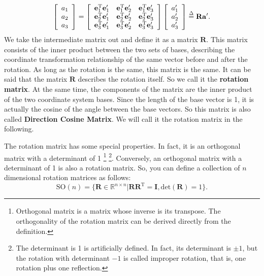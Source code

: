 \begin{equation}
\left[ \begin{array}{l}
{a_1}\\
{a_2}\\
{a_3}
\end{array}\right]=\left[{\begin{array}{*{20}{c}}    
    {\mathbf{e}_1^\mathrm{T}\mathbf{e}_1'} & {\mathbf{e}_1^\mathrm{T}\mathbf{e}_2'} & {\mathbf{e}_1^\mathrm{T}\mathbf{e}_3'}\\
    {\mathbf{e}_2^\mathrm{T}\mathbf{e}_1'} & {\mathbf{e}_2^\mathrm{T}\mathbf{e}_2'} & {\mathbf{e}_2^\mathrm{T}\mathbf{e}_3'}\\
    {\mathbf{e}_3^\mathrm{T}\mathbf{e}_1'} & {\mathbf{e}_3^\mathrm{T}\mathbf{e}_2'} & {\mathbf{e}_3^\mathrm{T}\mathbf{e}_3'}
    \end{array}} \right]\left[ \begin{array}{l}
a_1'\\
a_2'\\
a_3'
\end{array} \right] \buildrel \Delta \over = \mathbf{R} \mathbf{a}'.
\end{equation}
We take the intermediate matrix out and define it as a matrix $ \mathbf{R} $. This matrix consists of the inner product between the two sets of bases, describing the coordinate transformation relationship of the same vector before and after the rotation. As long as the rotation is the same, this matrix is the same. It can be said that the matrix $ \mathbf{R} $ describes the rotation itself. So we call it the \textbf{rotation matrix}. At the same time, the components of the matrix are the inner product of the two coordinate system bases. Since the length of the base vector is 1, it is actually the cosine of the angle between the base vectors. So this matrix is also called \textbf{Direction Cosine Matrix}. We will call it the rotation matrix in the following.

The rotation matrix has some special properties. In fact, it is an orthogonal matrix with a determinant of 1 \footnote{Orthogonal matrix is a matrix whose inverse is its transpose. The orthogonality of the rotation matrix can be derived directly from the definition. } \footnote{The determinant is 1 is artificially defined. In fact, its determinant is $\pm 1 $, but the rotation with determinant $ - 1 $ is called improper rotation, that is, one rotation plus one reflection. }. Conversely, an orthogonal matrix with a determinant of 1 is also a rotation matrix. So, you can define a collection of $n$ dimensional rotation matrices as follows:
\begin{equation}
\mathrm{SO}(n) = \{ \mathbf{R} \in \mathbb{R}^{n \times n} | \mathbf{R R}^\mathrm{T} = \mathbf{I}, \mathrm{det} (\mathbf{R})=1 \}.
\end{equation}

